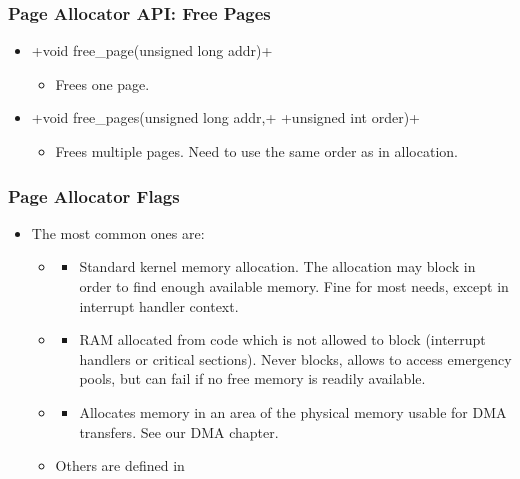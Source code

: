 \begin{frame}[fragile]
  \frametitle{Page Allocator API: Free Pages}
  \begin{itemize}
  \item {}+void free_page(unsigned long addr)+
    \begin{itemize}
    \item Frees one page.
    \end{itemize}
  \item {}+void free_pages(unsigned long addr,+
    +unsigned int order)+
    \begin{itemize}
    \item Frees multiple pages. Need to use the same order as in
      allocation.
    \end{itemize}
  \end{itemize}
\end{frame}

\begin{frame}
  \frametitle{Page Allocator Flags}
  \begin{itemize}
  \item The most common ones are:
    \begin{itemize}
    \item {}
      \begin{itemize}
      \item Standard kernel memory allocation. The allocation may
        block in order to find enough available memory. Fine for most
        needs, except in interrupt handler context.
      \end{itemize}
    \item {}
      \begin{itemize}
      \item RAM allocated from code which is not allowed to block
        (interrupt handlers or critical sections). Never blocks,
        allows to access emergency pools, but can fail if no free
        memory is readily available.
      \end{itemize}
    \item {}
      \begin{itemize}
      \item Allocates memory in an area of the physical memory usable
        for DMA transfers. See our DMA chapter.
      \end{itemize}
    \item Others are defined in 
    \end{itemize}
  \end{itemize}
\end{frame}

